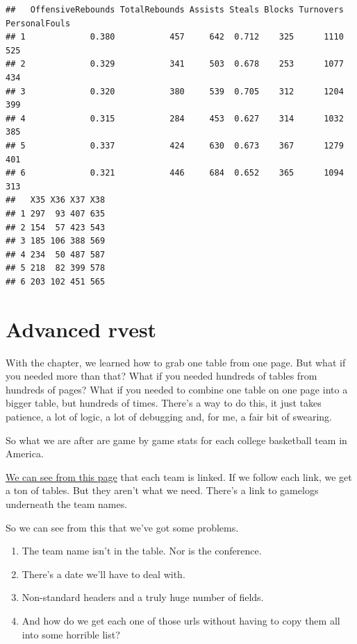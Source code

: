 \documentclass[
]{book}
\providecommand{\tightlist}{%
  \setlength{\itemsep}{0pt}\setlength{\parskip}{0pt}}
\begin{document}
\begin{verbatim}
##   OffensiveRebounds TotalRebounds Assists Steals Blocks Turnovers PersonalFouls
## 1             0.380           457     642  0.712    325      1110           525
## 2             0.329           341     503  0.678    253      1077           434
## 3             0.320           380     539  0.705    312      1204           399
## 4             0.315           284     453  0.627    314      1032           385
## 5             0.337           424     630  0.673    367      1279           401
## 6             0.321           446     684  0.652    365      1094           313
##   X35 X36 X37 X38
## 1 297  93 407 635
## 2 154  57 423 543
## 3 185 106 388 569
## 4 234  50 487 587
## 5 218  82 399 578
## 6 203 102 451 565
\end{verbatim}

\hypertarget{advanced-rvest}{%
\chapter{Advanced rvest}\label{advanced-rvest}}

With the chapter, we learned how to grab one table from one page. But what if you needed more than that? What if you needed hundreds of tables from hundreds of pages? What if you needed to combine one table on one page into a bigger table, but hundreds of times. There's a way to do this, it just takes patience, a lot of logic, a lot of debugging and, for me, a fair bit of swearing.

So what we are after are game by game stats for each college basketball team in America.

\href{https://www.sports-reference.com/cbb/seasons/2019-school-stats.html}{We can see from this page} that each team is linked. If we follow each link, we get a ton of tables. But they aren't what we need. There's a link to gamelogs underneath the team names.

So we can see from this that we've got some problems.

\begin{enumerate}
\def\labelenumi{\arabic{enumi}.}
\tightlist
\item
  The team name isn't in the table. Nor is the conference.
\item
  There's a date we'll have to deal with.
\item
  Non-standard headers and a truly huge number of fields.
\item
  And how do we get each one of those urls without having to copy them all into some horrible list?
\end{enumerate}
\end{document}

